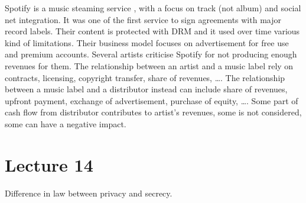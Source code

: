 \documentclass[a4paper, 10pt, titlepage]{article}
\begin{document}
Spotify is a music steaming service , with a focus on track (not album) and social net integration. It was one of the first service to sign agreements with major record labels. Their content is protected with DRM and it used over time various kind of limitations. Their business model focuses on advertisement for free use and premium accounts. Several artists criticise Spotify for not producing enough revenues for them. The relationship between an artist and a music label rely on contracts, licensing, copyright transfer, share of revenues, \dots. The relationship between a music label and a distributor instead can include share of revenues, upfront payment, exchange of advertisement, purchase of equity, \dots.
Some part of cash flow from distributor contributes to artist's revenues, some is not considered, some can have a negative impact.

\section{Lecture 14}
Difference in law between privacy and secrecy.
\end{document}
